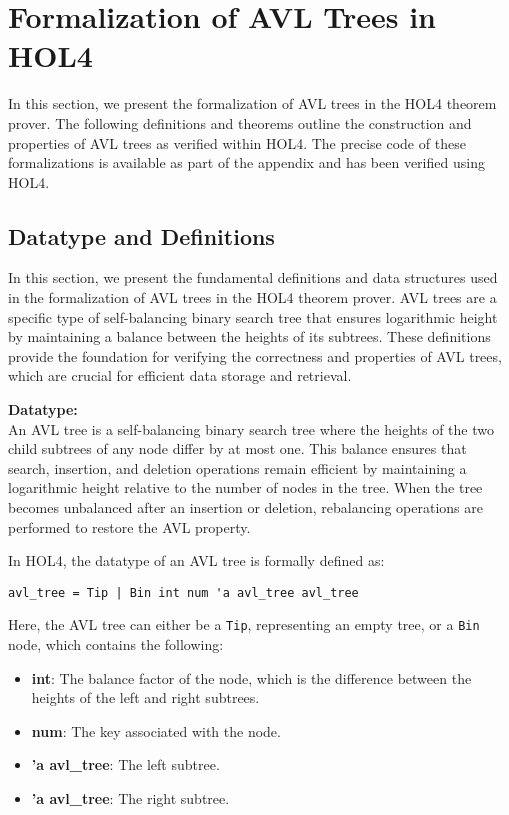 \documentclass[12pt]{article}
\begin{document}
\section{Formalization of AVL Trees in HOL4}

In this section, we present the formalization of AVL trees in the HOL4 theorem prover. The following definitions and theorems outline the construction and properties of AVL trees as verified within HOL4. The precise code of these formalizations is available as part of the appendix and has been verified using HOL4.

\subsection{Datatype and Definitions}

In this section, we present the fundamental definitions and data structures used in the formalization of AVL trees in the HOL4 theorem prover. AVL trees are a specific type of self-balancing binary search tree that ensures logarithmic height by maintaining a balance between the heights of its subtrees. These definitions provide the foundation for verifying the correctness and properties of AVL trees, which are crucial for efficient data storage and retrieval.

\textbf{Datatype:} \\
An AVL tree is a self-balancing binary search tree where the heights of the two child subtrees of any node differ by at most one. This balance ensures that search, insertion, and deletion operations remain efficient by maintaining a logarithmic height relative to the number of nodes in the tree. When the tree becomes unbalanced after an insertion or deletion, rebalancing operations are performed to restore the AVL property.

In HOL4, the datatype of an AVL tree is formally defined as:

\begin{verbatim}
avl_tree = Tip | Bin int num 'a avl_tree avl_tree
\end{verbatim}

Here, the AVL tree can either be a \texttt{Tip}, representing an empty tree, or a \texttt{Bin} node, which contains the following:
\begin{itemize}
    \item \textbf{int}: The balance factor of the node, which is the difference between the heights of the left and right subtrees.
    \item \textbf{num}: The key associated with the node.
    \item \textbf{'a avl\_tree}: The left subtree.
    \item \textbf{'a avl\_tree}: The right subtree.
\end{itemize}
\end{document}
